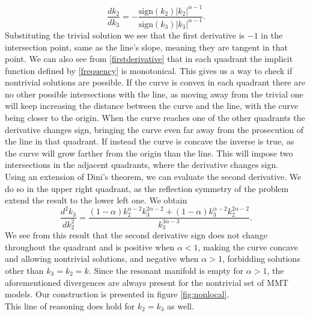    \begin{equation}
        \frac{d k_2}{dk_3} = -\frac{\text{sign}(k_2)|k_2|^{\alpha-1}}{\text{sign}(k_3)|k_3|^{\alpha-1}}.
        \label{firstderivative}
    \end{equation}
    Substituting the trivial solution we see that the first derivative is $-1$ in the intersection point, same as the line's slope, meaning they are tangent in that point. We can also see from \eqref{firstderivative} that in each quadrant the implicit function defined by \eqref{frequency} is monotonical. This gives us a way to check if nontrivial solutions are possible. If the curve is 
    convex in each quadrant there are no other possible intersections with the line, as moving away from the trivial one will keep increasing the distance between the curve and the line, with the curve being closer to the origin. When the curve reaches one of the other quadrants the derivative changes sign, bringing the curve even far away from the prosecution of the line in that quadrant. If instead the curve is concave the inverse is true, as the curve will grow farther from the origin than the line. This will impose two intersections in the adjacent quadrants, where the derivative changes sign.\\
    Using an extension of Dini's theorem, we can evaluate the second derivative. We do so in the upper right quadrant, as the reflection symmetry of the problem extend the result to the lower left one. We obtain 
    \begin{equation}
        \frac{d^2k_3}{dk_2^2} = \frac{(1-\alpha)k_2^{\alpha-2}k_3^{2\alpha-2} + (1-\alpha)k_3^{\alpha-2}k_2^{2\alpha-2}}{k_3^{3\alpha-3}}.
    \end{equation}   
    We see from this result that the second derivative sign does not change throughout the quadrant and is positive when $\alpha < 1 $, making the curve concave and allowing nontrivial solutions, and negative when $\alpha > 1$, forbidding solutions other than $k_3 = k_2 = k$. Since the resonant manifold is empty for $\alpha>1$, the aforementioned divergences are always present for the nontrivial set of MMT models. Our construction is presented in figure \ref{fig:nonlocal}.\\
    This line of reasoning does hold for $k_2 = k_3$ as well.\\
